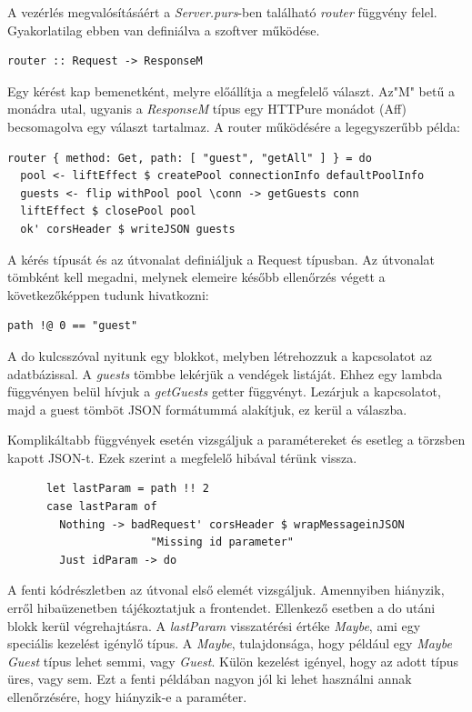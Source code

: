 \documentclass[12pt]{article}
\begin{document}
A vezérlés megvalósításáért a \textit{Server.purs}-ben található \textit{router} függvény felel. Gyakorlatilag ebben van definiálva a szoftver működése.
\begin{verbatim}
router :: Request -> ResponseM
\end{verbatim}
Egy kérést kap bemenetként, melyre előállítja a megfelelő választ. Az"M" betű a monádra utal, ugyanis a \textit{ResponseM} típus egy HTTPure monádot (Aff) becsomagolva egy választ tartalmaz. A router működésére a legegyszerűbb példa:
\begin{verbatim}
router { method: Get, path: [ "guest", "getAll" ] } = do
  pool <- liftEffect $ createPool connectionInfo defaultPoolInfo
  guests <- flip withPool pool \conn -> getGuests conn
  liftEffect $ closePool pool
  ok' corsHeader $ writeJSON guests
\end{verbatim}
A kérés típusát és az útvonalat definiáljuk a Request típusban. Az útvonalat tömbként kell megadni, melynek elemeire később ellenőrzés végett a következőképpen tudunk hivatkozni:
\begin{verbatim}
path !@ 0 == "guest"
\end{verbatim}
A do kulcsszóval nyitunk egy blokkot, melyben létrehozzuk a kapcsolatot az adatbázissal. A \textit{guests} tömbbe lekérjük a vendégek listáját. Ehhez egy lambda függvényen belül hívjuk a \textit{getGuests} getter függvényt. Lezárjuk a kapcsolatot, majd a guest tömböt JSON formátummá alakítjuk, ez kerül a válaszba.

Komplikáltabb függvények esetén vizsgáljuk a paramétereket és esetleg a törzsben kapott JSON-t. Ezek szerint a megfelelő hibával térünk vissza.
\begin{verbatim}
      let lastParam = path !! 2
      case lastParam of
        Nothing -> badRequest' corsHeader $ wrapMessageinJSON 
                      "Missing id parameter"
        Just idParam -> do
\end{verbatim}
A fenti kódrészletben az útvonal első elemét vizsgáljuk. Amennyiben hiányzik, erről hibaüzenetben tájékoztatjuk a frontendet. Ellenkező esetben a do utáni blokk kerül végrehajtásra. A \textit{lastParam} visszatérési értéke \textit{Maybe}, ami egy speciális kezelést igénylő típus. A \textit{Maybe}, tulajdonsága, hogy például egy \textit{Maybe Guest} típus lehet semmi, vagy \textit{Guest}. Külön kezelést igényel, hogy az adott típus üres, vagy sem. Ezt a fenti példában nagyon jól ki lehet használni annak ellenőrzésére, hogy hiányzik-e a paraméter.

\newpage
\end{document}
